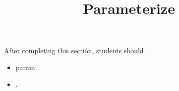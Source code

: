 \documentclass{ximera}
\title{Parameterize}
\begin{document}
\begin{abstract}
\end{abstract}
\maketitle

\begin{sectionOutcomes}
After completing this section, students should 

\begin{itemize}
\item param.
\item .
\end{itemize}
\end{sectionOutcomes}
\end{document}
